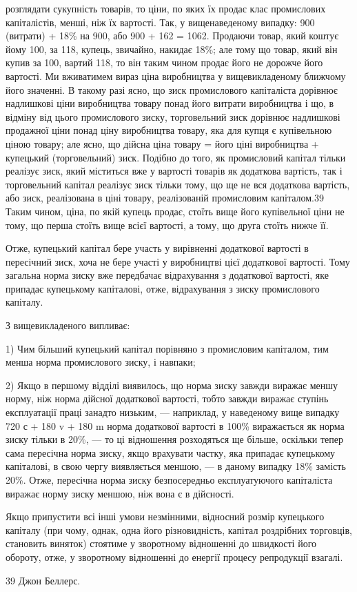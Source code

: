 розглядати сукупність товарів, то ціни, по яких їх продає клас
промислових капіталістів, менші, ніж їх вартості. Так, у вищенаведеному випадку: 900 (витрати) + 18\%
на 900, або 900 + 162 =
1062. Продаючи товар, який коштує йому 100, за 118, купець, звичайно,
накидає 18\%; але тому що товар, який він купив за 100,
вартий 118, то він таким чином продає його не дорожче його
вартості. Ми вживатимем вираз ціна виробництва у вищевикладеному
ближчому його значенні. В такому разі ясно, що зиск
промислового капіталіста дорівнює надлишкові ціни виробництва
товару понад його витрати виробництва і що, в відміну від цього
промислового зиску, торговельний зиск дорівнює надлишкові
продажної ціни понад ціну виробництва товару, яка для купця
є купівельною ціною товару; але ясно, що дійсна ціна товару =
його ціні виробництва + купецький (торговельний) зиск. Подібно
до того, як промисловий капітал тільки реалізує зиск, який міститься
вже у вартості товарів як додаткова вартість, так і торговельний
капітал реалізує зиск тільки тому, що ще не вся
додаткова вартість, або зиск, реалізована в ціні товару, реалізованій
промисловим капіталом.39 Таким чином, ціна, по якій купець
продає, стоїть вище його купівельної ціни не тому, що
перша стоїть вище всієї вартості, а тому, що друга стоїть нижче її.

Отже, купецький капітал бере участь у вирівненні додаткової
вартості в пересічний зиск, хоча не бере участі у виробництві
цієї додаткової вартості. Тому загальна норма зиску вже
передбачає відрахування з додаткової вартості, яке припадає купецькому
капіталові, отже, відрахування з зиску промислового
капіталу.

З вищевикладеного випливає:

1) Чим більший купецький капітал порівняно з промисловим
капіталом, тим менша норма промислового зиску, і навпаки;

2) Якщо в першому відділі виявилось, що норма зиску завжди
виражає меншу норму, ніж норма дійсної додаткової вартості,
тобто завжди виражає ступінь експлуатації праці занадто низьким,
— наприклад, у наведеному вище випадку 720 с + 180 v + 180 m
норма додаткової вартості в 100\% виражається як норма зиску
тільки в 20\%, — то ці відношення розходяться ще більше,
оскільки тепер сама пересічна норма зиску, якщо врахувати
частку, яка припадає купецькому капіталові, в свою чергу виявляється
меншою, — в даному випадку 18\% замість 20\%. Отже,
пересічна норма зиску безпосередньо експлуатуючого капіталіста
виражає норму зиску меншою, ніж вона є в дійсності.

Якщо припустити всі інші умови незмінними, відносний розмір
купецького капіталу (при чому, однак, одна його різновидність,
капітал роздрібних торговців, становить виняток) стоятиме
у зворотному відношенні до швидкості його обороту, отже,
у зворотному відношенні до енергії процесу репродукції взагалі.

39 Джон Беллерс.
